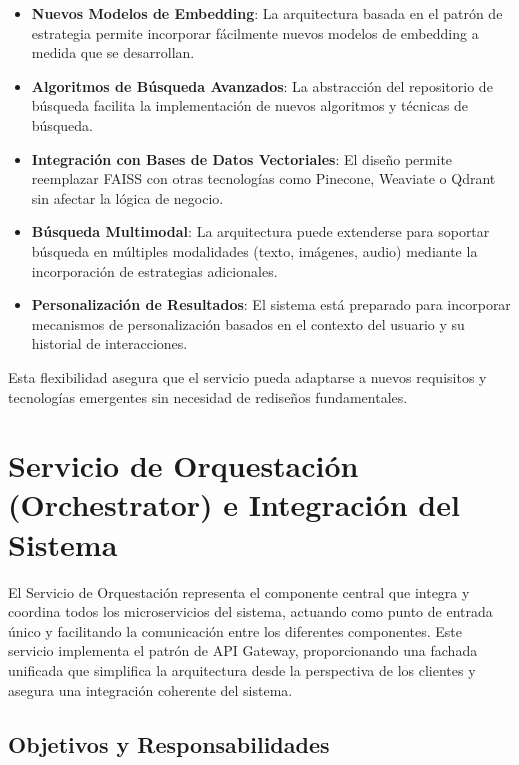 \documentclass[12pt,a4paper]{article}
\begin{document}
\begin{itemize}
    \item \textbf{Nuevos Modelos de Embedding}: La arquitectura basada en el patrón de estrategia permite incorporar fácilmente nuevos modelos de embedding a medida que se desarrollan.
    
    \item \textbf{Algoritmos de Búsqueda Avanzados}: La abstracción del repositorio de búsqueda facilita la implementación de nuevos algoritmos y técnicas de búsqueda.
    
    \item \textbf{Integración con Bases de Datos Vectoriales}: El diseño permite reemplazar FAISS con otras tecnologías como Pinecone, Weaviate o Qdrant sin afectar la lógica de negocio.
    
    \item \textbf{Búsqueda Multimodal}: La arquitectura puede extenderse para soportar búsqueda en múltiples modalidades (texto, imágenes, audio) mediante la incorporación de estrategias adicionales.
    
    \item \textbf{Personalización de Resultados}: El sistema está preparado para incorporar mecanismos de personalización basados en el contexto del usuario y su historial de interacciones.
\end{itemize}

Esta flexibilidad asegura que el servicio pueda adaptarse a nuevos requisitos y tecnologías emergentes sin necesidad de rediseños fundamentales.

\section{Servicio de Orquestación (Orchestrator) e Integración del Sistema}
\label{sec:orchestrator-service}

El Servicio de Orquestación representa el componente central que integra y coordina todos los microservicios del sistema, actuando como punto de entrada único y facilitando la comunicación entre los diferentes componentes. Este servicio implementa el patrón de API Gateway, proporcionando una fachada unificada que simplifica la arquitectura desde la perspectiva de los clientes y asegura una integración coherente del sistema.

\subsection{Objetivos y Responsabilidades}
\label{subsec:os-objetivos}
\end{document}
